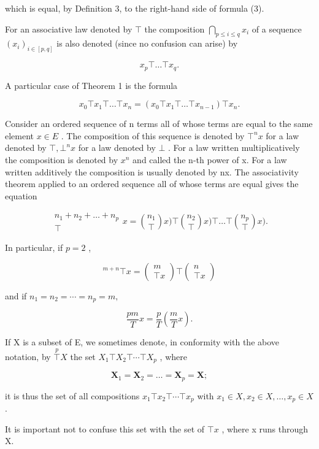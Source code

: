 which is equal, by Definition 3, to the right-hand side of formula (3).

For an associative law denoted by \(\top\) the composition \(\bigcap_{p\leqslant i\leqslant q}x_i\) of a sequence \((x_i)_{i\in [p,q]}\) is also denoted (since no confusion can arise) by

\[
x _ {p} \top \dots \top x _ {q}.
\]

A particular case of Theorem 1 is the formula

\[
x _ {0} \top x _ {1} \top \dots \top x _ {n} = (x _ {0} \top x _ {1} \top \dots \top x _ {n - 1}) \top x _ {n}.
\]

Consider an ordered sequence of n terms all of whose terms are equal to the same element \(x \in E\) . The composition of this sequence is denoted by \(\top^{n} x\) for a law denoted by \(\top, \bot^{n} x\) for a law denoted by \(\bot\) . For a law written multiplicatively the composition is denoted by \(x^{n}\) and called the n-th power of x. For a law written additively the composition is usually denoted by nx. The associativity theorem applied to an ordered sequence all of whose terms are equal gives the equation

\[
\begin{array}{c} n _ {1} + n _ {2} + \dots + n _ {p} \\ \top \end{array} x = \binom {n _ {1}} {\top} x) \top \binom {n _ {2}} {\top} x) \top \dots \top \binom {n _ {p}} {\top} x).
\]

In particular, if \(p = 2\) ,

\[
{ } ^ { m + n } \top x = \left( \begin{array} { c } m \\ \top x \end{array} \right) \top \left( \begin{array} { c } n \\ \top x \end{array} \right)\tag{4}
\]

and if \(n_1 = n_2 = \cdots = n_p = m,\)

\[
\frac {p m}{T} x = \frac {p}{T} \left(\frac {m}{T} x\right).\tag{5}
\]

If X is a subset of E, we sometimes denote, in conformity with the above notation, by \(\overset{p}{\top}X\) the set \(X_{1}\top X_{2}\top\cdots\top X_{p}\) , where

\[
\mathbf {X} _ {1} = \mathbf {X} _ {2} = \dots = \mathbf {X} _ {p} = \mathbf {X};
\]

it is thus the set of all compositions \(x_{1} \top x_{2} \top \cdots \top x_{p}\) with \(x_{1} \in X, x_{2} \in X, \ldots, x_{p} \in X\) .

It is important not to confuse this set with the set of \(\top x\) , where x runs through X.

